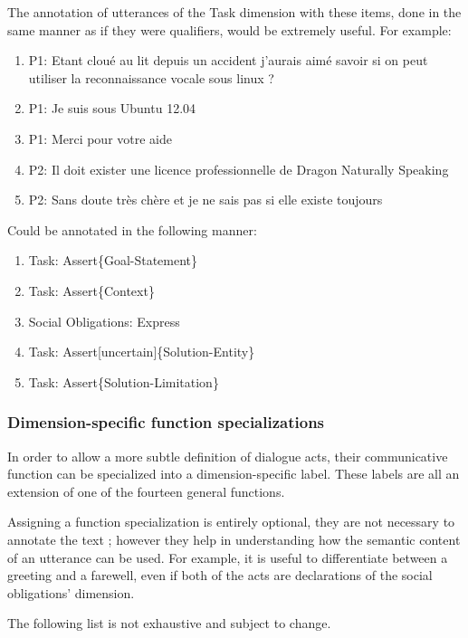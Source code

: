 The annotation of utterances of the Task dimension with these items, done in the same manner as if they were qualifiers, would be extremely useful. For example:

\begin{enumerate}
	\item P1: Etant cloué au lit depuis un accident j'aurais aimé savoir si on peut utiliser la reconnaissance vocale sous linux ?
	\item P1: Je suis sous Ubuntu 12.04
	\item P1: Merci pour votre aide
	\item P2: Il doit exister une licence professionnelle de Dragon Naturally Speaking
	\item P2: Sans doute très chère et je ne sais pas si elle existe toujours
\end{enumerate}

Could be annotated in the following manner:

\begin{enumerate}
	\item Task: Assert\{Goal-Statement\}
	\item Task: Assert\{Context\}
	\item Social Obligations: Express
	\item Task: Assert[uncertain]\{Solution-Entity\}
	\item Task: Assert\{Solution-Limitation\}
\end{enumerate}



\subsubsection{Dimension-specific function specializations}

In order to allow a more subtle definition of dialogue acts, their communicative function can be specialized into a dimension-specific label. These labels are all an extension of one of the fourteen general functions.

Assigning a function specialization is entirely optional, they are not necessary to annotate the text ; however they help in understanding how the semantic content of an utterance can be used. For example, it is useful to differentiate between a greeting and a farewell, even if both of the acts are declarations of the social obligations' dimension.

The following list is not exhaustive and subject to change.

